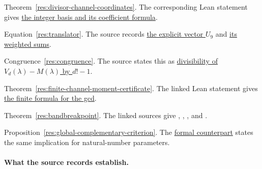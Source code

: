 \documentclass[11pt]{article}
\begin{document}
Theorem~\ref{res:divisor-channel-coordinates}. The corresponding Lean statement gives
\href{https://github.com/wcook04/plectis-erdos/blob/f36a98bf3d3e6f65f1074e3b800e3293d5b8a51a/ErdosProblems/Erdos68/PaperCompleteDivisorCoordinates.lean#L260}{the integer basis and its coefficient formula}.

Equation~\eqref{res:translator}. The source
records \href{https://github.com/wcook04/plectis-erdos/blob/f36a98bf3d3e6f65f1074e3b800e3293d5b8a51a/ErdosProblems/Erdos68/PaperCompleteSupplementary.lean#L17}{the explicit vector $U_9$}
and \href{https://github.com/wcook04/plectis-erdos/blob/f36a98bf3d3e6f65f1074e3b800e3293d5b8a51a/ErdosProblems/Erdos68/PaperCompleteSupplementary.lean#L45}{its weighted sums}.

Congruence~\eqref{res:congruence}. The source states this as
\href{https://github.com/wcook04/plectis-erdos/blob/f36a98bf3d3e6f65f1074e3b800e3293d5b8a51a/ErdosProblems/Erdos68/PaperCompleteSupplementary.lean#L53}{divisibility of $V_d(\lambda)-M(\lambda)$ by $d!-1$}.

Theorem~\ref{res:finite-channel-moment-certificate}. The linked Lean statement gives
\href{https://github.com/wcook04/plectis-erdos/blob/f36a98bf3d3e6f65f1074e3b800e3293d5b8a51a/ErdosProblems/Erdos68/PaperCompleteMomentHorizon.lean#L252}{the finite formula for the gcd}.

Theorem~\ref{res:bandbreakpoint}. The linked sources give
,
,
, and
.

Proposition~\ref{res:global-complementary-criterion}. The \href{https://github.com/wcook04/plectis-erdos/blob/f36a98bf3d3e6f65f1074e3b800e3293d5b8a51a/ErdosProblems/Erdos68/PaperCompleteExisting.lean#L156}{formal counterpart}
states the same implication for natural-number parameters.

\par\endgroup

\paragraph{What the source records establish.}
\end{document}
